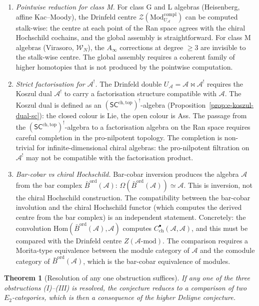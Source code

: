 \documentclass[11pt,reqno]{amsart}
\newtheorem{theorem}{Theorem}[section]
\theoremstyle{definition}
\theoremstyle{remark}
\providecommand{\cA}{\mathcal{A}}
\providecommand{\cW}{\mathcal{W}}
\providecommand{\Ainf}{A_\infty}
\providecommand{\Etwo}{E_2}
\providecommand{\SCchtop}{\ensuremath{\mathsf{SC}^{\mathrm{ch,top}}}}
\providecommand{\Barord}{\bar{B}^{\mathrm{ord}}}
\providecommand{\Hom}{\mathrm{Hom}}
\begin{document}
\begin{enumerate}[label=\textup{(\Roman*)}]
\item \emph{Pointwise reduction for class M.}
 For class G and L algebras (Heisenberg, affine Kac--Moody),
 the Drinfeld centre
 \(\mathcal Z(\mathrm{Mod}^{\mathrm{compl}}_{U_\cA})\) can be computed
 stalk-wise:
 the centre at each point of the Ran space agrees with the
 chiral Hochschild cochains, and the global assembly is
 straightforward. For class M algebras (Virasoro, $\cW_N$),
 the $\Ainf$ corrections at degree $\ge 3$ are invisible to
 the stalk-wise centre. The global assembly requires a
 coherent family of higher homotopies that is not produced by
 the pointwise computation.

\item \emph{Strict factorisation for $\cA^!$.}
 The Drinfeld double $U_\cA = \cA \bowtie \cA^!$ requires
 the Koszul dual $\cA^!$ to carry a factorisation structure
 compatible with $\cA$. The Koszul dual is defined as an
 $(\SCchtop)^!$-algebra
 (Proposition~\ref{prop:e-koszul-dual-sc}): the closed colour
 is Lie, the open colour is Ass. The passage from the
 $(\SCchtop)^!$-algebra to a factorisation algebra on the Ran
 space requires careful completion in the pro-nilpotent
 topology. The completion is non-trivial for infinite-dimensional
 chiral algebras: the pro-nilpotent filtration on $\cA^!$ may
 not be compatible with the factorisation product.

\item \emph{Bar-cobar vs chiral Hochschild.}
 Bar-cobar inversion produces the algebra $\cA$ from the bar
 complex $\Barord(\cA)$:
 $\Omega(\Barord(\cA)) \simeq \cA$. This is inversion, not
 the chiral Hochschild construction. The compatibility between the
 bar-cobar involution and the chiral Hochschild functor (which
 computes the derived centre from the bar complex) is an
 independent statement. Concretely: the convolution
 $\Hom(\Barord(\cA), \cA)$ computes
 $C^\bullet_{\mathrm{ch}}(\cA, \cA)$, and this must be
 compared with the Drinfeld centre $Z(\cA\text{-mod})$.
 The comparison requires a Morita-type equivalence between
 the module category of $\cA$ and the comodule category of
 $\Barord(\cA)$, which is the bar-cobar equivalence of
 modules.
\end{enumerate}

\begin{theorem}[Resolution of any one obstruction suffices]
\label{thm:e-one-obstruction}
If any one of the three obstructions
\textup{(I)--(III)} is resolved, the
conjecture reduces to a comparison of two
$\Etwo$-categories, which is then a consequence of the
higher Deligne conjecture.
\end{theorem}
\end{document}

